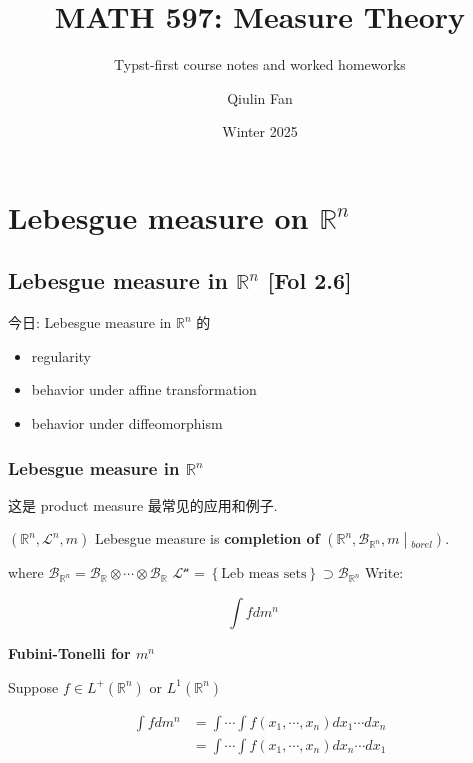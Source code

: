 \documentclass{qlnotes-export}
\title{MATH 597: Measure Theory}
\subtitle{Typst-first course notes and worked homeworks}
\author{Qiulin Fan}
\date{Winter 2025}
\begin{document}
\mainmatter
\chapter{\texorpdfstring{Lebesgue measure on \({\mathbb{R}}^{n}\)}{Lebesgue measure on \{\textbackslash mathbb\{R\}\}\^{}\{n\}}}\label{lebesgue-measure-on-mathbbrn}

\section{\texorpdfstring{Lebesgue measure in \({\mathbb{R}}^{n}\) {[}Fol 2.6{]}}{Lebesgue measure in \{\textbackslash mathbb\{R\}\}\^{}\{n\} {[}Fol 2.6{]}}}

今日: Lebesgue measure in \({\mathbb{R}}^{n}\) 的

\begin{itemize}
\item
  regularity
\item
  behavior under affine transformation
\item
  behavior under diffeomorphism
\end{itemize}

\subsection{\texorpdfstring{Lebesgue measure in \({\mathbb{R}}^{n}\)}{Lebesgue measure in \{\textbackslash mathbb\{R\}\}\^{}\{n\}}}\label{lebesgue-measure-in-mathbbrn}

这是 product measure 最常见的应用和例子.

\begin{definition}

\(({\mathbb{R}}^{n},\mathcal{L}^{n},m)\) Lebesgue measure is \textbf{completion of} \(\left. ({\mathbb{R}}^{n},\mathcal{B}_{{\mathbb{R}}^{n}},m \middle| {}_{borel}) \right.\).

\end{definition}

where \(\mathcal{B}_{{\mathbb{R}}^{n}} = \mathcal{B}_{\mathbb{R}} \otimes \cdots \otimes \mathcal{B}_{\mathbb{R}}\) \(\mathcal{L}^{\mathcal{n}} = \left\{ \text{Leb meas sets} \right\} \supset \mathcal{B}_{{\mathbb{R}}^{n}}\) Write:

\[\int f dm^{n}\quad\]

\begin{theorem}{\protect{}\label{kn-fubini-tonelli-for-m-n}{\textbf{Fubini-Tonelli
for \(m^{n}\)}}}

Suppose \(f \in L^{+}({\mathbb{R}}^{n})\) or \(L^{1}({\mathbb{R}}^{n})\)

\[\begin{matrix}
{\int f dm^{n}} & {= \int\cdots\int f(x_{1},\cdots,x_{n}) dx_{1}\cdots dx_{n}} \\
 & {= \int\cdots\int f(x_{1},\cdots,x_{n}) dx_{n}\cdots dx_{1}}
\end{matrix}\]

\end{theorem}
\end{document}
